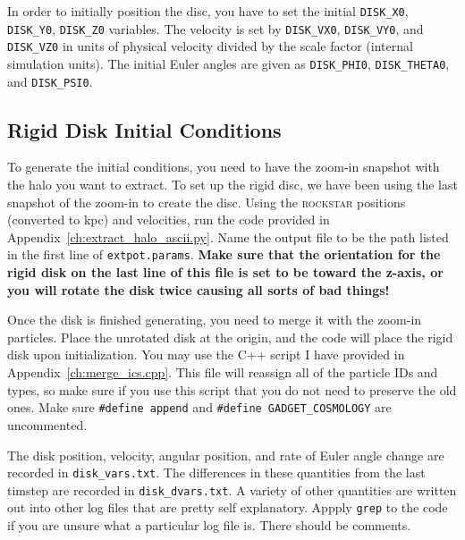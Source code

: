 In order to initially position the disc, you have to set the initial \texttt{DISK\_X0}, \texttt{DISK\_Y0}, \texttt{DISK\_Z0} variables. The velocity is set by \texttt{DISK\_VX0}, \texttt{DISK\_VY0}, and \texttt{DISK\_VZ0} in units of physical velocity divided by the scale factor (internal simulation units). The initial Euler angles are given as \texttt{DISK\_PHI0}, \texttt{DISK\_THETA0}, and \texttt{DISK\_PSI0}. 

\subsection{Rigid Disk Initial Conditions}

To generate the initial conditions, you need to have the zoom-in snapshot with the halo you want to extract. To set up the rigid disc, we have been using the last snapshot of the zoom-in to create the disc. Using the \textsc{rockstar} positions (converted to kpc) and velocities, run the code provided in Appendix~\ref{ch:extract_halo_ascii.py}. Name the output file to be the path listed in the first line of \texttt{extpot.params}. \textbf{Make sure that the orientation for the rigid disk on the last line of this file is set to be toward the z-axis, or you will rotate the disk twice causing all sorts of bad things!}

Once the disk is finished generating, you need to merge it with the zoom-in particles. Place the unrotated disk at the origin, and the code will place the rigid disk upon initialization. You may use the C++ script I have provided in Appendix~\ref{ch:merge_ics.cpp}. This file will reassign all of the particle IDs and types, so make sure if you use this script that you do not need to preserve the old ones. Make sure \texttt{\#define append} and \texttt{\#define GADGET\_COSMOLOGY} are uncommented.

The disk position, velocity, angular position, and rate of Euler angle change are recorded in \texttt{disk\_vars.txt}. The differences in these quantities from the last timstep are recorded in \texttt{disk\_dvars.txt}. A variety of other quantities are written out into other log files that are pretty self explanatory. Appply \texttt{grep} to the code if you are unsure what a particular log file is. There should be comments.




